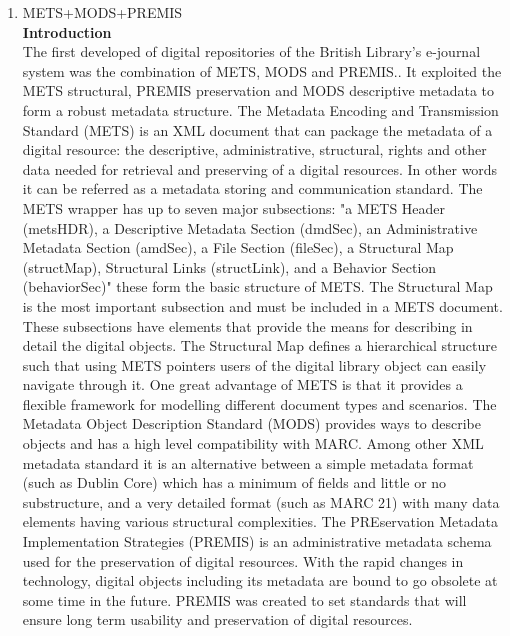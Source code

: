 \begin{enumerate}
	\item METS+MODS+PREMIS\\
	{\bf Introduction}\\
		The first developed of digital repositories of the British Library's e-journal system was the combination of METS, MODS and PREMIS..\cite{Dappert2008} 
		It exploited the METS structural, PREMIS preservation and MODS descriptive metadata to form a robust metadata structure. 
		The Metadata Encoding and Transmission Standard (METS) is an XML document that can package the metadata of a digital resource: 
		the descriptive, administrative, structural, rights and other data needed for retrieval and preserving of a digital resources.\cite{Guenther2003} 
		In other words it can be referred as a metadata storing and communication standard. The METS wrapper has up to seven major subsections: 
		"a METS Header (metsHDR), a Descriptive Metadata Section (dmdSec), an Administrative Metadata Section (amdSec), a File Section (fileSec), 
		a Structural Map (structMap), Structural Links (structLink), and a Behavior Section (behaviorSec)" these form the basic structure of METS. 
		The Structural Map is the most important subsection and must be included in a METS document.\cite{Cheslow2014} 
		These subsections have elements that provide the means for describing in detail the digital objects. 
		The Structural Map defines a hierarchical structure such that using METS pointers users of the digital library object can easily navigate through it. 
		One great advantage of METS is that it provides a flexible framework for modelling different document types and scenarios.\cite{Dappert2008}
		The Metadata Object Description Standard (MODS) provides ways to describe objects and has a high level compatibility with MARC. 
		Among other XML metadata standard it is an alternative between a simple metadata format (such as Dublin Core) 
		which has a minimum of fields and little or no substructure, and a very detailed format (such as MARC 21) with many data elements having various structural complexities.\cite{Guenther2003}
		The PREservation Metadata Implementation Strategies (PREMIS) is an administrative metadata schema used for the preservation of digital resources.\cite{Cheslow2014} 
		With the rapid changes in technology, digital objects including its metadata are bound to go obsolete at some time in the future. 
		PREMIS was created to set standards that will ensure long term usability and preservation of digital resources.
	

\end{enumerate}

